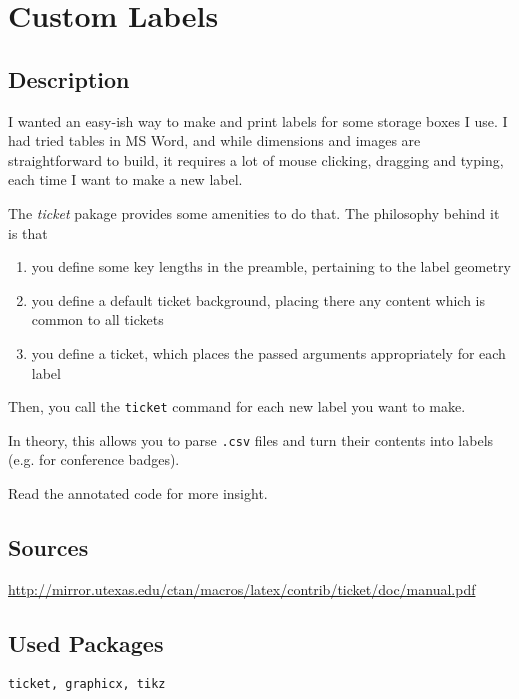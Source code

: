 \documentclass{article}
\begin{document}
\section*{Custom Labels}

\subsection*{Description}
I wanted an easy-ish way to make and print labels for some storage boxes I use. I had tried tables in MS Word, and while dimensions and images are straightforward to build, it requires a lot of mouse clicking, dragging and typing, each time I want to make a new label.

The \textit{ticket} pakage provides some amenities to do that.
The philosophy behind it is that
\begin{enumerate}
	\item you define some key lengths in the preamble, pertaining to the label geometry
	\item you define a default ticket background, placing there any content which is common to all tickets
	\item you define a ticket, which places the passed arguments appropriately for each label
\end{enumerate}
Then, you call the \texttt{ticket} command for each new label you want to make.

In theory, this allows you to parse \texttt{.csv} files and turn their contents into labels (e.g. for conference badges).

Read the annotated code for more insight.

\subsection*{Sources}
\url{http://mirror.utexas.edu/ctan/macros/latex/contrib/ticket/doc/manual.pdf}

\subsection*{Used Packages}
\verb|ticket, graphicx, tikz|
\end{document}
